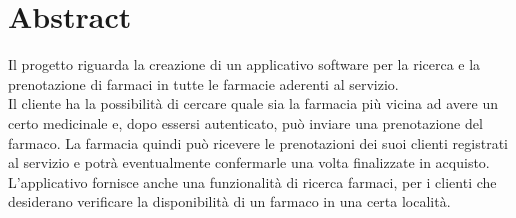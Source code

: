 \newpage
{}
\section{Abstract}
Il progetto riguarda la creazione di un applicativo software per la ricerca e
la prenotazione di farmaci in tutte le farmacie aderenti al servizio. \\
Il cliente ha la possibilità di cercare quale sia la farmacia più vicina ad
avere un certo medicinale e, dopo essersi autenticato, può inviare una
prenotazione del farmaco. La farmacia quindi può ricevere le prenotazioni dei
suoi clienti registrati al servizio e potrà eventualmente confermarle 
una volta finalizzate in acquisto.
L'applicativo fornisce anche una funzionalità di ricerca farmaci, per i clienti
che desiderano verificare la disponibilità di un farmaco in una certa località.
